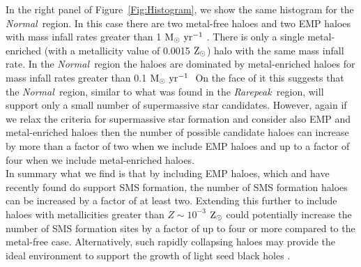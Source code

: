 \documentclass[twocolumn,iop,revtex4]{openjournal}
\newcommand{\msolaryr} {$\rm{M_{\odot}~yr^{-1}}~$}
\newcommand{\msolaryrc} {$\rm{M_{\odot}~yr^{-1}}$}
\newcommand{\zsolar} {$\rm{Z_{\odot}}~$}
\newcommand{\zsolarc} {$\rm{Z_{\odot}}$}
\newcommand{\rarepeak} {\textit{Rarepeak~}}
\newcommand{\normal} {\textit{Normal~}}
\begin{document}
\indent In the right panel of Figure~\ref{Fig:Histogram},
we show the same histogram for the \normal region. In this case there are two metal-free haloes
and two EMP haloes with mass infall rates greater than 1 \msolaryr. There is only a single metal-enriched
(with a metallicity value of 0.0015 \zsolarc)
halo with the same mass infall rate. In the \normal region the haloes are dominated by metal-enriched haloes
for mass infall rates greater than 0.1 \msolaryr
On the face of it this suggests that the \normal region, similar to what was found in the \rarepeak region, will
support only a small number of supermassive star candidates. However, again
if we relax the criteria for supermassive star formation and consider also EMP and metal-enriched haloes
then the number of possible candidate haloes can increase by more than a factor of two when we include EMP haloes
and up to a factor of four when we include metal-enriched haloes. \\
\indent In summary what we find is that by including EMP haloes, which \cite{Chon_2020} and
\cite{Tagawa_2020} have recently found do support SMS formation, the number of SMS formation haloes
can be increased by a factor of at least two. Extending this further to include haloes
with metallicities greater than $Z \sim 10^{-3}$ \zsolar could potentially increase the number of
SMS formation sites by a factor of up to four or more compared to the metal-free case. Alternatively,
such rapidly collapsing haloes may provide the ideal environment to support the growth of light seed
black holes \citep[e.g.][]{Alexander_2014, Inayoshi_2018}.
\end{document}
